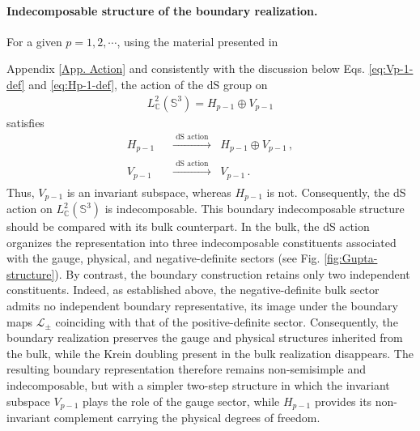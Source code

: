 \documentclass[aps,twocolumn,nofootinbib]{revtex4}
\begin{document}
\paragraph{Indecomposable structure of the boundary realization.} For a given $p=1,2,\cdots$, using the material presented in {Appendix \ref{App. Action} and consistently with the discussion below Eqs. \eqref{eq:Vp-1-def} and \eqref{eq:Hp-1-def}, the action of the dS group on \begin{align}
    L^2_{\mathbb C}({\mathbb{S}}^3) = H_{p-1}\oplus V_{p-1}
\end{align}
satisfies
\begin{align}
    H_{p-1} \;\; &\xrightarrow[]{\text{ dS action }} \;\; H_{p-1}\oplus V_{p-1} \,, \label{actionHp-1} \\[3pt]
    V_{p-1} \;\; &\xrightarrow[]{\text{ dS action }} \;\; V_{p-1} \,.\label{actionVp-1}
\end{align}
Thus, $V_{p-1}$ is an invariant subspace, whereas $H_{p-1}$ is not. Consequently, the dS action on $L^2_{\mathbb C}({\mathbb{S}}^3)$ is indecomposable. This boundary indecomposable structure should be compared with its bulk counterpart. In the bulk, the dS action organizes the representation into three indecomposable constituents associated with the gauge, physical, and negative-definite sectors (see Fig. \ref{fig:Gupta-structure}). By contrast, the boundary construction retains only two independent constituents. Indeed, as established above, the negative-definite bulk sector admits no independent boundary representative, its image under the boundary maps ${\mathcal{L}}_\pm$ coinciding with that of the positive-definite sector. Consequently, the boundary realization preserves the gauge and physical structures inherited from the bulk, while the Krein doubling present in the bulk realization disappears. The resulting boundary representation therefore remains non-semisimple and indecomposable, but with a simpler two-step structure in which the invariant subspace $V_{p-1}$ plays the role of the gauge sector, while $H_{p-1}$ provides its non-invariant complement carrying the physical degrees of freedom.
  
}
\end{document}
